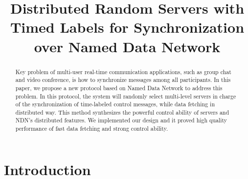 \documentclass[conference]{IEEEtran}
\begin{document}
\title{Distributed Random Servers with Timed Labels for Synchronization over Named Data Network}
\author{
}
\maketitle


\begin{abstract}
Key problem of multi-user real-time communication applications,
such as group chat and video conference,
is how to synchronize messages among all participants.
In this paper, we propose a new protocol based on Named Data Network to address this problem.
In this protocol, the system will randomly select multi-level servers
in charge of the synchronization of time-labeled control messages,
while data fetching in distributed way.
This method synthesizes the powerful control ability of servers and NDN's distributed features.
We implemented our design and it proved high quality performance of fast data fetching and strong control ability.
\end{abstract}

\IEEEpeerreviewmaketitle

\section{Introduction}
\end{document}
